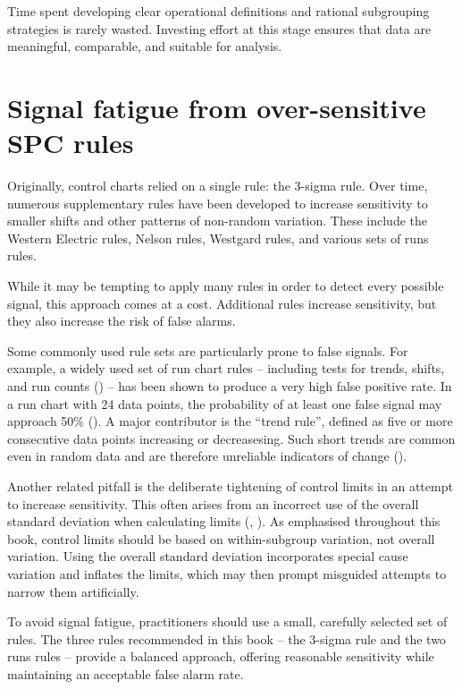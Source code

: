 \documentclass[
]{book}
\begin{document}
Time spent developing clear operational definitions and rational
subgrouping strategies is rarely wasted. Investing effort at this stage
ensures that data are meaningful, comparable, and suitable for analysis.

\section{Signal fatigue from over-sensitive SPC
rules}\label{signal-fatigue-from-over-sensitive-spc-rules}

Originally, control charts relied on a single rule: the 3-sigma rule.
Over time, numerous supplementary rules have been developed to increase
sensitivity to smaller shifts and other patterns of non-random
variation. These include the Western Electric rules, Nelson rules,
Westgard rules, and various sets of runs rules.

While it may be tempting to apply many rules in order to detect every
possible signal, this approach comes at a cost. Additional rules
increase sensitivity, but they also increase the risk of false alarms.

Some commonly used rule sets are particularly prone to false signals.
For example, a widely used set of run chart rules -- including tests for
trends, shifts, and run counts () -- has been shown to produce a very high false positive rate. In
a run chart with 24 data points, the probability of at least one false
signal may approach 50\% (). A
major contributor is the ``trend rule'', defined as five or more
consecutive data points increasing or decreasesing. Such short trends
are common even in random data and are therefore unreliable indicators
of change ().

Another related pitfall is the deliberate tightening of control limits
in an attempt to increase sensitivity. This often arises from an
incorrect use of the overall standard deviation when calculating limits
(,
). As emphasised throughout this book,
control limits should be based on within-subgroup variation, not overall
variation. Using the overall standard deviation incorporates special
cause variation and inflates the limits, which may then prompt misguided
attempts to narrow them artificially.

To avoid signal fatigue, practitioners should use a small, carefully
selected set of rules. The three rules recommended in this book -- the
3-sigma rule and the two runs rules -- provide a balanced approach,
offering reasonable sensitivity while maintaining an acceptable false
alarm rate.
\end{document}
